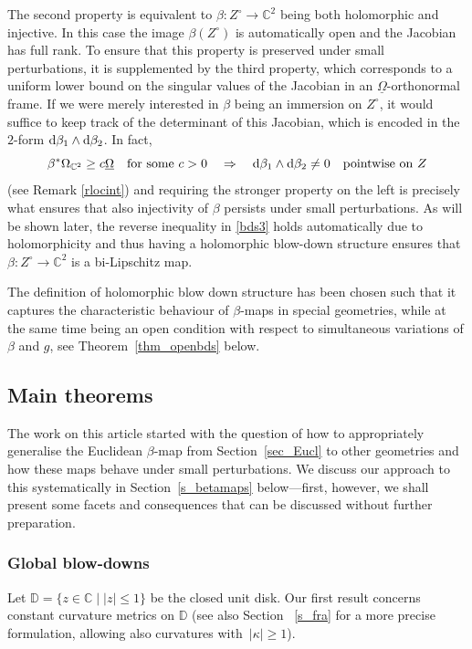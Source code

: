\documentclass[pdftex]{sigma}
\numberwithin{equation}{section}
\theoremstyle{definition}
\newcommand{\C}{\mathbb{C}} %
\newcommand{\DD}{\mathbb{D}} %
\newcommand{\1}{{\bf 1}}
\newcommand{\Om}{{\underline{\Omega}}}
\begin{document}
The second property is equivalent to $\beta\colon Z^\circ \rightarrow \C^2$ being both holomorphic and injective. In this case the image $\beta(Z^\circ)$ is automatically open and the Jacobian has full rank. To ensure that this property is preserved under small perturbations, it is supplemented by the third property, which corresponds to a uniform lower bound on the singular values of the Jacobian in an $\Om$-orthonormal frame. If we were merely interested in $\beta$ being an immersion on $Z^\circ$, it would suffice to keep track of the determinant of this Jacobian, which is encoded in the $2$-form ${\rm d}\beta_1\wedge {\rm d}\beta_2$. In fact,
\begin{equation}\label{locint}
\beta^*\Omega_{\C^2} \ge c \Om \quad\text{for some} \  c>0\quad \Rightarrow \quad {\rm d}\beta_1\wedge {\rm d}\beta_2 \neq 0 \quad\text{pointwise on} \  Z
\end{equation}
(see Remark \ref{rlocint}) and requiring the stronger property on the left is
 precisely what ensures that also injectivity of $\beta$ persists under small perturbations. As will be shown later, the reverse inequality in \ref{bds3} holds automatically due to holomorphicity and thus having a holomorphic blow-down structure ensures that $\beta\colon Z^\circ \rightarrow \C^2$ is a bi-Lipschitz map.

The definition of holomorphic blow down structure has been chosen such that it captures the characteristic behaviour of $\beta$-maps in special geometries, while at the same time being an open condition with respect to simultaneous variations of $\beta$ and $g$, see Theorem~\ref{thm_openbds} below.








\subsection{Main theorems}
The work on this article started with the question of how to appropriately generalise the Euclidean $\beta$-map from Section~\ref{sec_Eucl} to other geometries and how these maps behave under small perturbations.
 We discuss our approach to this systematically in Section~\ref{s_betamaps} below---first, however, we shall present some facets and consequences that can be discussed without further preparation.


\subsubsection{Global blow-downs} Let $\DD=\{z\in \C \mid |z|\le 1\}$ be the closed unit disk. Our first result concerns constant curvature metrics on $\DD$ (see also Section~ \ref{s_fra} for a more precise formulation, allowing also curvatures with~${|\kappa|\ge 1}$).
\end{document}
